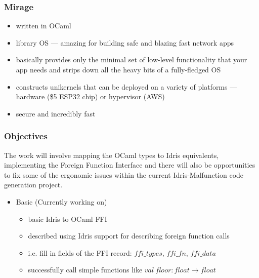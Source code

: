 \documentclass{beamer}
\begin{document}
\begin{frame}
	\frametitle{Mirage}

	\begin{itemize}
		\item written in OCaml
		\item library OS --- amazing for building safe and
		      blazing fast network apps
		\item basically provides only the minimal set of low-level
		      functionality that your app needs and strips down all the
		      heavy bits of a fully-fledged OS
		\item constructs unikernels that can be deployed on
		      a variety of platforms --- hardware (\$5 ESP32 chip)
		      or hypervisor (AWS)
		\item secure and incredibly fast
	\end{itemize}
\end{frame}


\begin{frame}
	\frametitle{Objectives}

	The work will involve mapping the OCaml types to Idris equivalents,
	implementing the Foreign Function Interface and there will also be
	opportunities to fix some of the ergonomic issues within the
	current Idris-Malfunction code generation project.

	\begin{itemize}
		\item Basic	(Currently working on)
		      \begin{itemize}
			      \item basic Idris to OCaml FFI
			      \item described using Idris support for describing
			            foreign function calls
			      \item i.e. fill in fields of the FFI record:
			            $ffi\_types$, $ffi\_fn$, $ffi\_data$
			      \item successfully call simple functions like
			            $val \ floor : float \rightarrow float$
		      \end{itemize}
	\end{itemize}
\end{frame}
\end{document}
